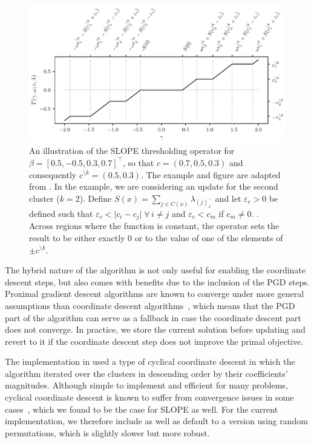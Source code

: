 \documentclass[article]{jss}
\makeatletter
\let\natwidth\Gin@nat@width
\makeatother
\begin{document}
\begin{figure}[t]
  \centering
  \includegraphics[width=\natwidth]{images/slope-thresholding.pdf}
  \caption{
  An illustration of the SLOPE thresholding operator for \(\beta = [0.5, -0.5, 0.3, 0.7]^\intercal\),
  so that \(c = (0.7, 0.5, 0.3)\) and consequently \(c^{\setminus k} = (0.5, 0.3)\).
  The example and figure are adapted from \citet{larsson2023}.
  In the example, we are considering an update for the second cluster (\(k = 2\)).
  Define \(S(x) = \sum_{j \in
    C(x)}\lambda_{(j)^-_{x}}\) and let \(\varepsilon_c > 0\) be defined such that
  \(\varepsilon_c < \big| c_i - c_j\big|\;\forall\, i \neq j\) and
  \(\varepsilon_c < c_m\) if \(c_m \neq 0\).
  . Across regions where the function is constant,
  the operator sets the result to be either exactly 0 or to the value of one
  of the elements of \(\pm c^{\setminus k}\).
  }
  \label{fig:slope-thresholding}
\end{figure}

The hybrid nature of the algorithm is not only useful for enabling the
coordinate descent steps, but also comes with benefits due to the inclusion of
the PGD steps. Proximal gradient descent algorithms are known to converge under
more general assumptions than coordinate descent algorithms~\citep{wright2015},
which means that the PGD part of the algorithm can serve as a fallback in case
the coordinate descent part does not converge. In practice, we store the
current solution before updating and revert to it if the coordinate descent
step does not improve the primal objective.

The implementation in \citet{larsson2023} used a type of cyclical coordinate
descent in which the algorithm iterated over the clusters in descending order
by their coefficients' magnitudes. Although simple to implement
and efficient for many problems, cyclical coordinate descent is known
to suffer from convergence issues in some cases~\citep{wright2015}, which
we found to be the case for SLOPE as well.
For the current implementation, we therefore include as well as default
to a version using random permutations, which is slightly slower but
more robust.
\end{document}
